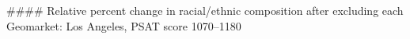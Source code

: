 #### Relative percent change in racial/ethnic composition after excluding each Geomarket: Los Angeles, PSAT score 1070–1180
